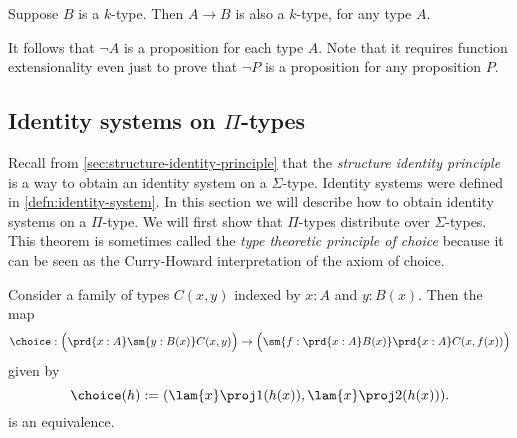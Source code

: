 \begin{cor}\label{cor:funtype_trunc}
Suppose $B$ is a $k$-type. Then $A\to B$ is also a $k$-type, for any type $A$.
\end{cor}

\begin{rmk}
  It follows that $\neg A$ is a proposition for each type $A$. Note that it requires function extensionality even just to prove that $\neg P$ is a proposition for any proposition $P$.
\end{rmk}

\subsection{Identity systems on \texorpdfstring{$\Pi$}{Π}-types}

Recall from \cref{sec:structure-identity-principle} that the \emph{structure identity principle} is a way to obtain an identity system on a $\Sigma$-type. Identity systems were defined in \cref{defn:identity-system}. In this section we will describe how to obtain identity systems on a $\Pi$-type. We will first show that $\Pi$-types distribute over $\Sigma$-types. This theorem is sometimes called the \emph{type theoretic principle of choice} because it can be seen as the Curry-Howard interpretation of the axiom of choice.

\begin{thm}\label{thm:choice}
Consider a family of types $C(x,y)$ indexed by $x:A$ and $y:B(x)$. Then the map
\begin{equation*}
  \choice:\Big(\prd{x:A}\sm{y:B(x)}C(x,y)\Big)\to \Big(\sm{f:\prd{x:A}B(x)}\prd{x:A}C(x,f(x))\Big)
\end{equation*}
given by
\begin{equation*}\label{eq:choice}
  \choice(h):=(\lam{x}\proj 1(h(x)),\lam{x}\proj 2(h(x))).
\end{equation*}
is an equivalence.
\end{thm}

